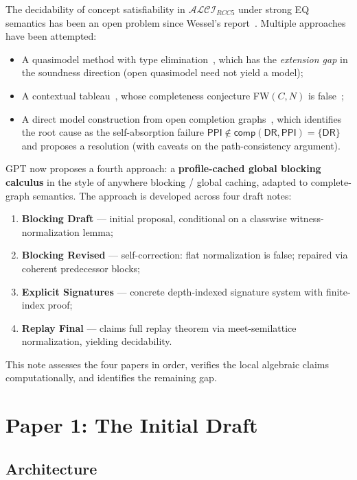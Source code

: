 \documentclass[a4paper,11pt]{article}
\theoremstyle{definition}
\newcommand{\ALCIRCC}[1]{\ensuremath{\mathcal{ALCI}_{\mathit{RCC#1}}}}
\newcommand{\DR}{\ensuremath{\mathsf{DR}}}
\newcommand{\PPI}{\ensuremath{\mathsf{PPI}}}
\newcommand{\comp}{\ensuremath{\mathsf{comp}}}
\begin{document}
The decidability of concept satisfiability in $\ALCIRCC{5}$ under
strong EQ semantics has been an open problem since Wessel's
report~\cite{Wessel2003}.  Multiple approaches have been attempted:
\begin{itemize}[nosep]
\item A quasimodel method with type elimination~\cite{CompanionPaper},
  which has the \emph{extension gap} in the soundness direction (open
  quasimodel need not yield a model);
\item A contextual tableau~\cite{GPTContextual}, whose completeness
  conjecture FW$(C,N)$ is false~\cite{FWCounterexample};
\item A direct model construction from open completion
  graphs~\cite{ExtensionGap}, which identifies the root cause as the
  self-absorption failure $\PPI \notin \comp(\DR, \PPI) = \{\DR\}$
  and proposes a resolution (with caveats on the path-consistency
  argument).
\end{itemize}

GPT now proposes a fourth approach: a \textbf{profile-cached global
blocking calculus} in the style of anywhere blocking / global caching,
adapted to complete-graph semantics.  The approach is developed across
four draft notes:
\begin{enumerate}[nosep]
\item \textbf{Blocking Draft} --- initial proposal, conditional on a
  classwise witness-normalization lemma;
\item \textbf{Blocking Revised} --- self-correction: flat
  normalization is false; repaired via coherent predecessor blocks;
\item \textbf{Explicit Signatures} --- concrete depth-indexed
  signature system with finite-index proof;
\item \textbf{Replay Final} --- claims full replay theorem via
  meet-semilattice normalization, yielding decidability.
\end{enumerate}

This note assesses the four papers in order, verifies the local
algebraic claims computationally, and identifies the remaining gap.


\section{Paper 1: The Initial Draft}
\label{sec:paper1}

\subsection{Architecture}
\end{document}
